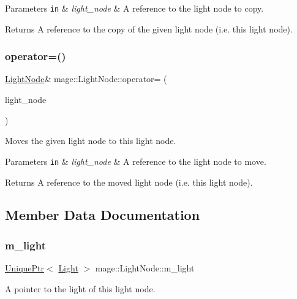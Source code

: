 \begin{DoxyParams}[1]{Parameters}
\mbox{\tt in}  & {\em light\+\_\+node} & A reference to the light node to copy. \\
\hline
\end{DoxyParams}
\begin{DoxyReturn}{Returns}
A reference to the copy of the given light node (i.\+e. this light node). 
\end{DoxyReturn}
\hypertarget{classmage_1_1_light_node_abda92f7cf2ce3aed3af94d2278e2bfa1}{}\label{classmage_1_1_light_node_abda92f7cf2ce3aed3af94d2278e2bfa1} 
\subsubsection{\texorpdfstring{operator=()}{operator=()}\hspace{0.1cm}{\footnotesize\ttfamily [2/2]}}
{\footnotesize\ttfamily \hyperlink{classmage_1_1_light_node}{Light\+Node}\& mage\+::\+Light\+Node\+::operator= (\begin{DoxyParamCaption}\item[{\hyperlink{classmage_1_1_light_node}{Light\+Node} \&\&}]{light\+\_\+node }\end{DoxyParamCaption})\hspace{0.3cm}{\ttfamily [delete]}}

Moves the given light node to this light node.


\begin{DoxyParams}[1]{Parameters}
\mbox{\tt in}  & {\em light\+\_\+node} & A reference to the light node to move. \\
\hline
\end{DoxyParams}
\begin{DoxyReturn}{Returns}
A reference to the moved light node (i.\+e. this light node). 
\end{DoxyReturn}


\subsection{Member Data Documentation}
\hypertarget{classmage_1_1_light_node_aad97d01d2adb66eac0e93bdcdb919a05}{}\label{classmage_1_1_light_node_aad97d01d2adb66eac0e93bdcdb919a05} 
\subsubsection{\texorpdfstring{m\+\_\+light}{m\_light}}
{\footnotesize\ttfamily \hyperlink{namespacemage_a8c307fbcc33bce9b7f2aa4c26c3b95cf}{Unique\+Ptr}$<$ \hyperlink{classmage_1_1_light}{Light} $>$ mage\+::\+Light\+Node\+::m\+\_\+light\hspace{0.3cm}{\ttfamily [private]}}

A pointer to the light of this light node. 